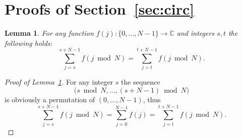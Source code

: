 \documentclass[a4paper]{article}
\newtheorem{lemma}{Lemma}[section]
\begin{document}

%



\appendix

\section{Proofs of Section~\ref{sec:circ}} \label{app:circ}

\begin{lemma}\label{lm:sum-shift}
	For any function $f(j):\{0,\dots,N-1\}\to \mathbb{C}$ and integers  $s,t$ the following holds:
	\[
	\sum_{j=s}^{s+N-1} f(j \bmod N) = \sum_{j=t}^{t+N-1} f(j \bmod N).
	\]
	\end{lemma}
\begin{proof}[Proof of Lemma~\ref{lm:sum-shift}]
For any integer $s$ the sequence 
	\[
	\Big(s \bmod N, \dots, (s+N-1) \bmod N\Big)
	\]
	is obviously a permutation of $(0,\dots, N-1)$, thus
	\[
	\sum_{j=s}^{s+N-1} f(j \bmod N) = \sum_{j=0}^{N-1} f(j) = \sum_{j=t}^{t+N-1} f(j \bmod N).
	\]
	\end{proof}
	
\end{document}
